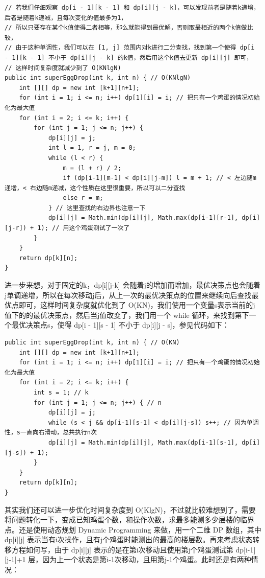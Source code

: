 \documentclass[9pt, b5paaper]{book}
\begin{document}
\begin{enumerate}
\begin{verbatim}
// 若我们仔细观察 dp[i - 1][k - 1] 和 dp[i][j - k]，可以发现前者是随着k递增，后者是随着k递减，且每次变化的值最多为1，
// 所以只要存在某个k值使得二者相等，那么就能得到最优解，否则取最相近的两个k值做比较，
// 由于这种单调性，我们可以在 [1, j] 范围内对k进行二分查找，找到第一个使得 dp[i - 1][k - 1] 不小于 dp[i][j - k] 的k值，然后用这个k值去更新 dp[i][j] 即可，
// 这样时间复杂度就减少到了 O(KNlgN)
public int superEggDrop(int k, int n) { // O(KNlgN)
    int [][] dp = new int [k+1][n+1];
    for (int i = 1; i <= n; i++) dp[1][i] = i; // 把只有一个鸡蛋的情况初始化为最大值
    for (int i = 2; i <= k; i++) {
        for (int j = 1; j <= n; j++) {
            dp[i][j] = j;
            int l = 1, r = j, m = 0;
            while (l < r) {
                m = (l + r) / 2;
                if (dp[i-1][m-1] < dp[i][j-m]) l = m + 1; // < 左边随m递增，< 右边随m递减，这个性质在这里很重要，所以可以二分查找
                else r = m;
            } // 这里查找的右边界也注意一下
            dp[i][j] = Math.min(dp[i][j], Math.max(dp[i-1][r-1], dp[i][j-r]) + 1); // 用这个鸡蛋测试了一次了
        }
    }
    return dp[k][n];
}
\end{verbatim}

进一步来想，对于固定的k，dp[i][j-k] 会随着j的增加而增加，最优决策点也会随着j单调递增，所以在每次移动j后，从上一次的最优决策点的位置来继续向后查找最优点即可，这样时间复杂度就优化到了 O(KN)，我们使用一个变量s表示当前的j值下的的最优决策点，然后当j值改变了，我们用一个 while 循环，来找到第下一个最优决策点s，使得 dp[i - 1][s - 1] 不小于 dp[i][j - s]，参见代码如下：

\begin{verbatim}
public int superEggDrop(int k, int n) { // O(KN)
    int [][] dp = new int [k+1][n+1];
    for (int i = 1; i <= n; i++) dp[1][i] = i; // 把只有一个鸡蛋的情况初始化为最大值
    for (int i = 2; i <= k; i++) {
        int s = 1; // k
        for (int j = 1; j <= n; j++) { // n
            dp[i][j] = j;
            while (s < j && dp[i-1][s-1] < dp[i][j-s]) s++; // 因为单调性，s一直向右滑动，总共执行n次
            dp[i][j] = Math.min(dp[i][j], Math.max(dp[i-1][s-1], dp[i][j-s]) + 1);
        }
    }
    return dp[k][n];
}
\end{verbatim}

其实我们还可以进一步优化时间复杂度到 O(KlgN)，不过就比较难想到了，需要将问题转化一下，变成已知鸡蛋个数，和操作次数，求最多能测多少层楼的临界点。还是使用动态规划 Dynamic Programming 来做，用一个二维 DP 数组，其中 dp[i][j] 表示当有i次操作，且有j个鸡蛋时能测出的最高的楼层数。再来考虑状态转移方程如何写，由于 dp[i][j] 表示的是在第i次移动且使用第j个鸡蛋测试第 dp[i-1][j-1]+1 层，因为上一个状态是第i-1次移动，且用第j-1个鸡蛋。此时还是有两种情况：


\end{enumerate}
\end{document}
